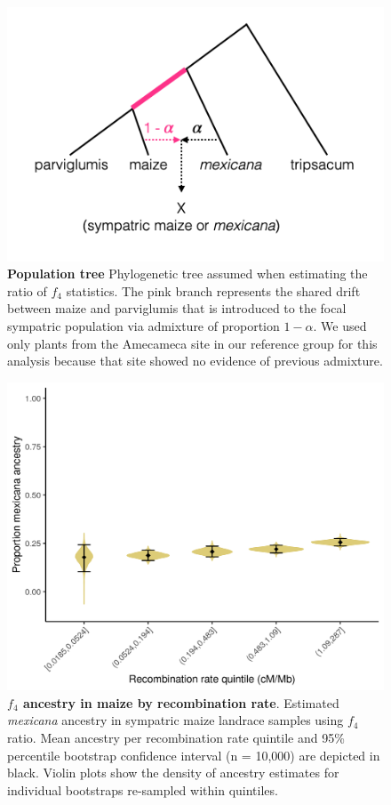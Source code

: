 \begin{figure}[ht]
\includegraphics[width=\textwidth]{chapter2/figures/tree_f4_stats.png}
\caption{\color{Gray} \textbf{Population tree} Phylogenetic tree assumed when estimating the ratio of $f_4$ statistics. The pink branch represents the shared drift between maize and parviglumis that is introduced to the focal sympatric population via admixture of proportion $1 - \alpha$. We used only plants from the Amecameca site in our \mexicana reference group for this analysis because that site showed no evidence of previous admixture.}
\label{f4_tree}
\end{figure}

\begin{figure}[ht]
\includegraphics[width=\textwidth]{chapter2/figures/f4_sympatric_maize_pop22_byr5.png}
\caption{\color{Gray} \textbf{$f_4$ ancestry in maize by recombination rate}. Estimated \textit{mexicana} ancestry in sympatric maize landrace samples using $f_4$ ratio. Mean ancestry per recombination rate quintile and 95\% percentile bootstrap confidence interval (n = 10,000) are depicted in black. Violin plots show the density of ancestry estimates for individual bootstraps re-sampled within quintiles.}
\label{f4_maize_by_r}
\end{figure}

